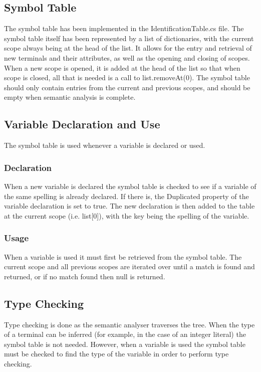 \documentclass{article}
\begin{document}
\subsection{Symbol Table}
The symbol table has been implemented in the IdentificationTable.cs file. The symbol table itself has been represented by a list of dictionaries, with the current scope always being at the head of the list. It allows for the entry and retrieval of new terminals and their attributes, as well as the opening and closing of scopes. When a new scope is opened, it is added at the head of the list so that when scope is closed, all that is needed is a call to list.removeAt(0). The symbol table should only contain entries from the current and previous scopes, and should be empty when semantic analysis is complete.

\subsection{Variable Declaration and Use}
The symbol table is used whenever a variable is declared or used.

\subsubsection{Declaration}
When a new variable is declared the symbol table is checked to see if a variable of the same spelling is already declared. If there is, the Duplicated property of the variable declaration is set to true. The new declaration is then added to the table at the current scope (i.e. list[0]), with the key being the spelling of the variable.

\subsubsection{Usage}
When a variable is used it must first be retrieved from the symbol table. The current scope and all previous scopes are iterated over until a match is found and returned, or if no match found then null is returned.

\subsection{Type Checking}
Type checking is done as the semantic analyser traverses the tree. When the type of a terminal can be inferred (for example, in the case of an integer literal) the symbol table is not needed. However, when a variable is used the symbol table must be checked to find the type of the variable in order to perform type checking.
\end{document}
